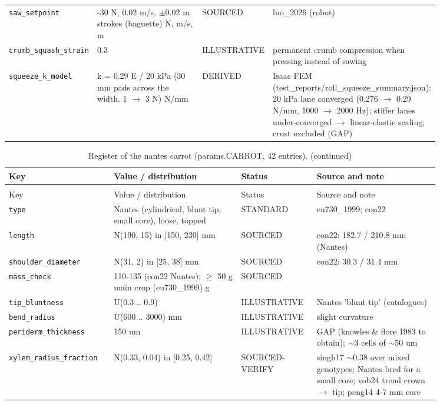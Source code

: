 \documentclass[10.5pt,a4paper]{article}
\begin{document}
{\begin{longtable}{@{}p{0.2\linewidth}p{0.27\linewidth}p{0.12\linewidth}p{0.26\linewidth}@{}}
\texttt{saw\_\allowbreak{}setpoint} & -30 N, 0.02 m/s, $\pm$0.02 m strokes (baguette) N, m/s, m & SOURCED & luo\_2026 (robot) \\
\texttt{crumb\_\allowbreak{}squash\_\allowbreak{}strain} & 0.3 & ILLUSTRATIVE & permanent crumb compression when pressing instead of sawing \\
\texttt{squeeze\_\allowbreak{}k\_\allowbreak{}model} & k = 0.29 E / 20 kPa (30 mm pads across the width, 1 $\to$ 3 N) N/mm & DERIVED & Isaac FEM (test\_reports/roll\_squeeze\_summary.json): 20 kPa lane converged (0.276 $\to$ 0.29 N/mm, 1000 $\to$ 2000 Hz); stiffer lanes under-converged $\to$ linear-elastic scaling; crust excluded (GAP) \\\bottomrule\end{longtable}}
{\scriptsize\begin{longtable}{@{}p{0.2\linewidth}p{0.27\linewidth}p{0.12\linewidth}p{0.26\linewidth}@{}}\caption{Register of the nantes carrot (params.CARROT, 42 entries).}\\\toprule Key & Value / distribution & Status & Source and note \\\midrule\endfirsthead
\caption[]{Register of the nantes carrot (params.CARROT, 42 entries). (continued)}\\\toprule Key & Value / distribution & Status & Source and note \\\midrule\endhead
\texttt{type} & Nantes (cylindrical, blunt tip, small core), loose, topped & STANDARD & eu730\_1999; con22 \\
\texttt{length} & N(190, 15) in [150, 230] mm & SOURCED & con22: 182.7 / 210.8 mm (Nantes) \\
\texttt{shoulder\_\allowbreak{}diameter} & N(31, 2) in [25, 38] mm & SOURCED & con22: 30.3 / 31.4 mm \\
\texttt{mass\_\allowbreak{}check} & 110-135 (con22 Nantes); $\ge$ 50 g main crop (eu730\_1999) g & SOURCED &  \\
\texttt{tip\_\allowbreak{}bluntness} & U(0.3 .. 0.9) & ILLUSTRATIVE & Nantes 'blunt tip' (catalogues) \\
\texttt{bend\_\allowbreak{}radius} & U(600 .. 3000) mm & ILLUSTRATIVE & slight curvature \\
\texttt{periderm\_\allowbreak{}thickness} & 150 um & ILLUSTRATIVE & GAP (knowles \& flore 1983 to obtain); $\sim$3 cells of $\sim$50 um \\
\texttt{xylem\_\allowbreak{}radius\_\allowbreak{}fraction} & N(0.33, 0.04) in [0.25, 0.42] & SOURCED-VERIFY & singh17 $\sim$0.38 over mixed genotypes; Nantes bred for a small core; vob24 trend crown $\to$ tip; peng14 4-7 mm core \\

\end{longtable}}
\end{document}
